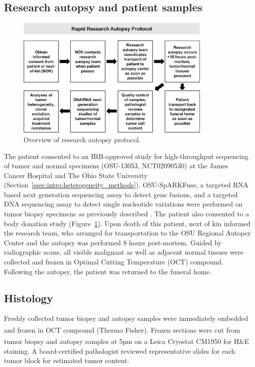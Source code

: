 \subsection{Research autopsy and patient samples}
\begin{figure}[htp]
    \begin{center}
        \includegraphics[width=0.85\textwidth,keepaspectratio]{images/240/autopsy_flowchart}
    \end{center}
    \caption{Overview of research autopsy protocol.}
    \label{fig:240:autopsy_flowchart}
\end{figure}
The patient consented to an IRB-approved study for high-throughput sequencing of tumor and normal specimens (OSU-13053, NCT02090530) at the James Cancer Hospital and The Ohio State University (Section~\ref{ssec:intro:heterogeneity_methods}). OSU-SpARKFuse, a targeted RNA based next generation sequencing assay to detect gene fusions, and a targeted DNA sequencing assay to detect single nucleotide variations were performed on tumor biopsy specimens as previously described \cite{samorodnitsky2015_ngs,reeser2017}. The patient also consented to a body donation study (Figure~\ref{fig:240:autopsy_flowchart}). Upon death of this patient, next of kin informed the research team, who arranged for transportation to the OSU Regional Autopsy Center and the autopsy was performed 8 hours post-mortem. Guided by radiographic scans, all visible malignant as well as adjacent normal tissues were collected and frozen in Optimal Cutting Temperature (OCT) compound. Following the autopsy, the patient was returned to the funeral home.

\subsection{Histology}
Freshly collected tumor biopsy and autopsy samples were immediately embedded and frozen in OCT compound (Thermo Fisher\textsuperscript\textregistered{}). Frozen sections were cut from tumor biopsy and autopsy samples at 5µm on a Leica\textsuperscript\texttrademark{} Cryostat CM1950 for H\&E staining. A board-certified pathologist reviewed representative slides for each tumor block for estimated tumor content.

